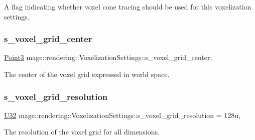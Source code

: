 A flag indicating whether voxel cone tracing should be used for this voxelization settings. \hypertarget{classmage_1_1rendering_1_1_voxelization_settings_a37151063ebbf6ae6ea193fb0ce05d270}{}\label{classmage_1_1rendering_1_1_voxelization_settings_a37151063ebbf6ae6ea193fb0ce05d270} 
\subsubsection{\texorpdfstring{s\+\_\+voxel\+\_\+grid\+\_\+center}{s\_voxel\_grid\_center}}
{\footnotesize\ttfamily \hyperlink{structmage_1_1_point3}{Point3} mage\+::rendering\+::\+Voxelization\+Settings\+::s\+\_\+voxel\+\_\+grid\+\_\+center\hspace{0.3cm}{\ttfamily [static]}, {\ttfamily [private]}}

The center of the voxel grid expressed in world space. \hypertarget{classmage_1_1rendering_1_1_voxelization_settings_aa709675f6700320077718e1954854ca6}{}\label{classmage_1_1rendering_1_1_voxelization_settings_aa709675f6700320077718e1954854ca6} 
\subsubsection{\texorpdfstring{s\+\_\+voxel\+\_\+grid\+\_\+resolution}{s\_voxel\_grid\_resolution}}
{\footnotesize\ttfamily \hyperlink{namespacemage_a41c104c036fba3756a74e19f793eeaa1}{U32} mage\+::rendering\+::\+Voxelization\+Settings\+::s\+\_\+voxel\+\_\+grid\+\_\+resolution = 128u\hspace{0.3cm}{\ttfamily [static]}, {\ttfamily [private]}}

The resolution of the voxel grid for all dimensions. \hypertarget{classmage_1_1rendering_1_1_voxelization_settings_a647150f56ef8546b6e18f5ad8dd2e661}{}\label{classmage_1_1rendering_1_1_voxelization_settings_a647150f56ef8546b6e18f5ad8dd2e661} 
